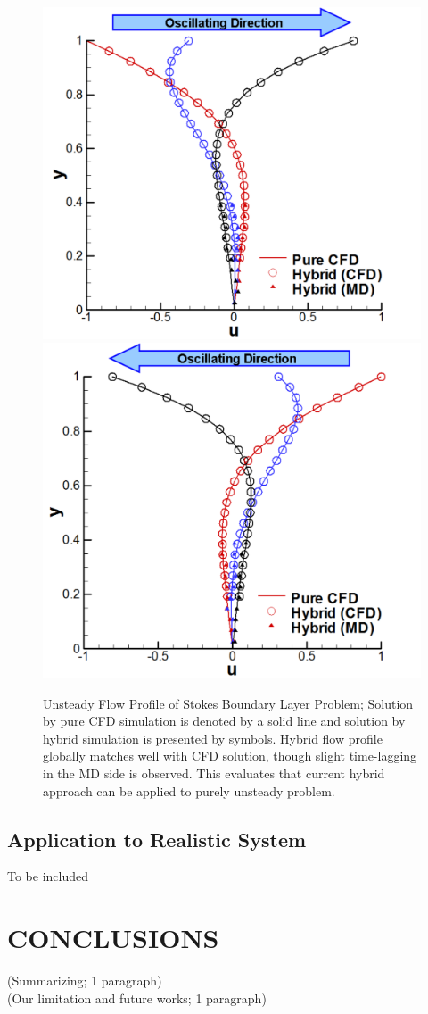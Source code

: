 \documentclass{CFD2010paper}
\begin{document}
%
\begin{figure}[ht]
\centering
\includegraphics[width=0.4\linewidth]{Stokes_Sol_1.pdf}
\hskip 1cm
\includegraphics[width=0.4\linewidth]{Stokes_Sol_2.pdf}
\vskip-0.2cm
\caption{Unsteady Flow Profile of Stokes Boundary Layer Problem; Solution by pure CFD simulation is denoted by a solid line and solution by hybrid simulation is presented by symbols. Hybrid flow profile globally matches well with CFD solution, though slight time-lagging in the MD side is observed. This evaluates that current hybrid approach can be applied to purely unsteady problem.}
\label{Stokes_Sol}
\end{figure}



\subsection{Application to Realistic System}

To be included\\




\section{CONCLUSIONS}
(Summarizing; 1 paragraph)\\

(Our limitation and future works; 1 paragraph)\\
\end{document}
